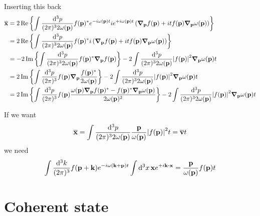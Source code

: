 Inserting this back
\begin{equation}
	\begin{split}
		\overline{\vb{x}}
		&=
		2\operatorname{\operatorname{Re}}\left\{
			\int\frac{\dd[3]{p}}{(2\pi)^32\omega(\vb{p})}
			f(\vb{p})^*
			e^{-i\omega(\vb{p})t}
			ie^{+i\omega(\vb{p})t}
			\left(
				\grad_{\vb{p}}
				f(\vb{p})
				+
				it
				f(\vb{p})
				\grad_{\vb{p}}
				\omega(\vb{p})
			\right)
		\right\}
		\\
		&=
		2\operatorname{\operatorname{Re}}\left\{
			\int\frac{\dd[3]{p}}{(2\pi)^32\omega(\vb{p})}
			f(\vb{p})^*
			i
			\left(
				\grad_{\vb{p}}
				f(\vb{p})
				+
				it
				f(\vb{p})
				\grad_{\vb{p}}
				\omega(\vb{p})
			\right)
		\right\}
		\\
		&=
		-
		2\operatorname{\operatorname{Im}}\left\{
			\int\frac{\dd[3]{p}}{(2\pi)^32\omega(\vb{p})}
			f(\vb{p})^*
			\grad_{\vb{p}}
			f(\vb{p})
		\right\}
		-
		2
		\int\frac{\dd[3]{p}}{(2\pi)^32\omega(\vb{p})}
		\abs{f(\vb{p})}^2
		\grad_{\vb{p}}
		\omega(\vb{p})t
		\\
		&=
		2\operatorname{\operatorname{Im}}\left\{
			\int\frac{\dd[3]{p}}{(2\pi)^3}
			f(\vb{p})
			\grad_{\vb{p}}
			\frac{f(\vb{p})^*}{2\omega(\vb{p})}
		\right\}
		-
		2
		\int\frac{\dd[3]{p}}{(2\pi)^32\omega(\vb{p})}
		\abs{f(\vb{p})}^2
		\grad_{\vb{p}}
		\omega(\vb{p})t
		\\
		&=
		2\operatorname{\operatorname{Im}}\left\{
			\int\frac{\dd[3]{p}}{(2\pi)^3}
			f(\vb{p})
			\frac{
				\omega(\vb{p})
				\grad_{\vb{p}}
				f(\vb{p})^*
				-
				f(\vb{p})^*
				\grad_{\vb{p}}
				\omega(\vb{p})
			}{2\omega(\vb{p})^2}
		\right\}
		-
		2
		\int\frac{\dd[3]{p}}{(2\pi)^32\omega(\vb{p})}
		\abs{f(\vb{p})}^2
		\grad_{\vb{p}}
		\omega(\vb{p})t
	\end{split}
\end{equation}

If we want
\begin{equation}
	\overline{\vb{x}}
	=
	\int\frac{\dd[3]{p}}{(2\pi)^32\omega(\vb{p})}
	\frac{\vb{p}}{\omega(\vb{p})}
	\abs{f(\vb{p})}^2
	t
	=
	\overline{\vb{v}}t
\end{equation}
we need
\begin{equation}
			\int\frac{\dd[3]{k}}{(2\pi)^3}
			f(\vb{p}+\vb{k})
			e^{-i\omega(\vb{k}+\vb{p})t}
			\int\dd[3]{x}
			\vb{x}
			e^{+i\vb{k}\vdot\vb{x}}
			=
			\frac{\vb{p}}{\omega(\vb{p})}f(\vb{p})t	
\end{equation}

\section{Coherent state}
